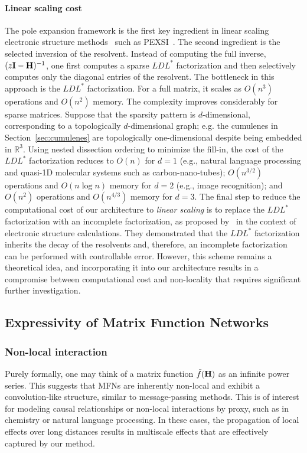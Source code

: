 \documentclass{article} \usepackage{iclr2024_conference,times}
\begin{document}
\paragraph{Linear scaling cost}
The pole expansion framework is the first key ingredient in linear scaling electronic structure methods~\cite{RevModPhys.71.1085} such as PEXSI~\cite{pexsi_CMS2009,pexsi_JCPM2013}.
The second ingredient is the selected inversion of the resolvent. 
Instead of computing the full inverse, $(z {\bf I} - {\bf H})^{-1}$, one first computes a sparse $LDL^*$ factorization and then selectively computes only the diagonal entries of the resolvent. The bottleneck in this approach is the $LDL^*$ factorization. For a full matrix, it scales as $O(n^3)$ operations and $O(n^2)$ memory. 
The complexity improves considerably for sparse matrices. Suppose that the sparsity pattern is $d$-dimensional, corresponding to a topologically $d$-dimensional graph; e.g. the cumulenes in Section~\ref{sec:cumulenes} are topologically one-dimensional despite being embedded in $\mathbb{R}^3$. Using nested dissection ordering to minimize the fill-in, the cost of the $LDL^*$ factorization reduces to $O(n)$ for $d = 1$ (e.g., natural language processing and quasi-1D molecular systems such as carbon-nano-tubes); $O(n^{3/2})$ operations and $O(n \log n)$ memory for $d = 2$ (e.g., image recognition); and $O(n^2)$ operations and $O(n^{4/3})$ memory for $d = 3$. The final step to reduce the computational cost of our architecture to {\em linear scaling} is to replace the $LDL^*$ factorization with an incomplete factorization, as proposed by~\citet{etter2020incomplete} in the context of electronic structure calculations. They demonstrated that the $LDL^*$ factorization inherits the decay of the resolvents and, therefore, an incomplete factorization can be performed with controllable error. However, this scheme remains a theoretical idea, and incorporating it into our architecture results in a compromise between computational cost and non-locality that requires significant further investigation.

\subsection{Expressivity of Matrix Function Networks}


\subsubsection*{Non-local interaction}
\vspace{-5pt}
Purely formally, one may think of a matrix function $\tilde{f}({\bf H})$ as an infinite power series.
This suggests that MFNs are inherently non-local and exhibit a convolution-like structure, similar to message-passing methods. 
This is of interest for modeling causal relationships or non-local interactions by proxy, such as in chemistry or natural language processing. In these cases, the propagation of local effects over long distances results in multiscale effects that are effectively captured by our method.
\end{document}

